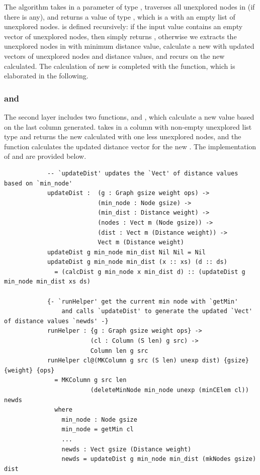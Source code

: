 The  algorithm takes in a parameter  of type , traverses all unexplored nodes in (if there is any), and returns a value of type , which is a  with an empty list of unexplored nodes.  is defined recursively: if the input value  contains an empty vector of unexplored nodes, then simply returns , otherwise we extracts the unexplored nodes in  with minimum distance value, calculate a new  with updated vectors of unexplored nodes and distance values, and recurs on the new  calculated. The calculation of new  is completed with the  function, which is elaborated in the following. 
\\

\subsubsection{ and } \label{second_layer}
The second layer includes two functions,  and , which calculate a new  value based on the last column generated.  takes in a column with non-empty unexplored list type and returns the new  calculated with one less unexplored nodes, and the  function calculates the updated distance vector for the new . The implementation of  and  are provided below. 
\begin{lstlisting}
			-- `updateDist' updates the `Vect' of distance values based on `min_node'
			updateDist :  (g : Graph gsize weight ops) ->
			              (min_node : Node gsize) ->
			              (min_dist : Distance weight) ->
			              (nodes : Vect m (Node gsize)) ->
			              (dist : Vect m (Distance weight)) ->
			              Vect m (Distance weight)
			updateDist g min_node min_dist Nil Nil = Nil
			updateDist g min_node min_dist (x :: xs) (d :: ds)
			  = (calcDist g min_node x min_dist d) :: (updateDist g min_node min_dist xs ds)

			{- `runHelper' get the current min node with `getMin'
				and calls `updateDist' to generate the updated `Vect' of distance values `newds' -}
			runHelper : {g : Graph gsize weight ops} ->
			            (cl : Column (S len) g src) ->
			            Column len g src
			runHelper cl@(MKColumn g src (S len) unexp dist) {gsize} {weight} {ops}
			  = MKColumn g src len 
			  			(deleteMinNode min_node unexp (minCElem cl)) newds
			  where
			  	min_node : Node gsize
    			min_node = getMin cl
			   	...
			    newds : Vect gsize (Distance weight)
			    newds = updateDist g min_node min_dist (mkNodes gsize) dist
\end{lstlisting}

